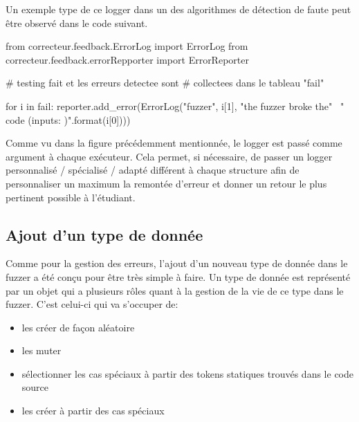\documentclass[a4paper]{report}
\begin{document}
Un exemple type de ce logger dans un des algorithmes de détection de faute peut être observé dans le code suivant.

\begin{python}
from correcteur.feedback.ErrorLog import ErrorLog
from correcteur.feedback.errorRepporter import ErrorReporter

# testing fait et les erreurs detectee sont
# collectees dans le tableau "fail"

for i in fail:
	reporter.add_error(ErrorLog("fuzzer", i[1],
		"the fuzzer broke the" \
		" code  (inputs: {})".format(i[0])))
\end{python}



Comme vu dans la figure précédemment mentionnée, le logger est passé comme argument à chaque exécuteur.
Cela permet, si nécessaire, de passer un logger personnalisé / spécialisé / adapté différent à chaque structure afin de personnaliser un maximum la remontée d'erreur et donner un retour le plus pertinent possible à l'étudiant.

\subsection{Ajout d'un type de donnée}

Comme pour la gestion des erreurs, l'ajout d'un nouveau type de donnée dans le fuzzer a été conçu pour être très simple à faire.
Un type de donnée est représenté par un objet qui a plusieurs rôles quant à la gestion de la vie de ce type dans le fuzzer.
C'est celui-ci qui va s'occuper de:
\begin{itemize}
\item les créer de façon aléatoire
\item les muter
\item sélectionner les cas spéciaux à partir des tokens statiques trouvés dans le code source
\item les créer à partir des cas spéciaux
\end{itemize}
\end{document}
